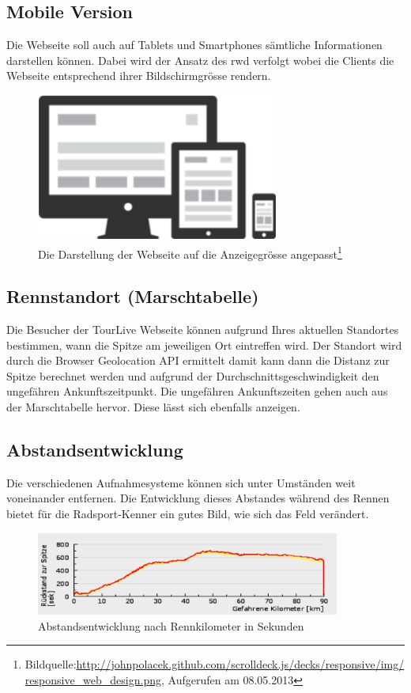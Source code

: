 \subsection{Mobile Version}
Die Webseite soll auch auf Tablets und Smartphones sämtliche Informationen darstellen können. Dabei wird der Ansatz des \gls{rwd} verfolgt wobei die Clients die Webseite entsprechend ihrer Bildschirmgrösse rendern.
\begin{figure}[H]
	\centering 
	\includegraphics[width=80mm]{images/tourliveweb/responsive.png}
	\caption{Die Darstellung der Webseite auf die Anzeigegrösse angepasst\footnote{Bildquelle:\url{http://johnpolacek.github.com/scrolldeck.js/decks/responsive/img/responsive_web_design.png}, Aufgerufen am 08.05.2013}}
\end{figure}
\subsection{Rennstandort (Marschtabelle)}
Die Besucher der TourLive Webseite können aufgrund Ihres aktuellen Standortes bestimmen, wann die Spitze am jeweiligen Ort eintreffen wird. Der Standort wird durch die Browser Geolocation API ermittelt damit kann dann die Distanz zur Spitze berechnet werden und aufgrund der Durchschnittsgeschwindigkeit den ungefähren Ankunftszeitpunkt.
Die ungefähren Ankunftszeiten gehen auch aus der Marschtabelle hervor. Diese lässt sich ebenfalls anzeigen.

\subsection{Abstandsentwicklung}
Die verschiedenen Aufnahmesysteme können sich unter Umständen weit voneinander entfernen. Die Entwicklung dieses Abstandes während des Rennen bietet für die Radsport-Kenner ein gutes Bild, wie sich das Feld verändert.
\begin{figure}[H]
	\centering
	\includegraphics[width=100mm]{images/tourliveweb/abstandsentwicklung.png}
	\caption{Abstandsentwicklung nach Rennkilometer in Sekunden}
\end{figure}

